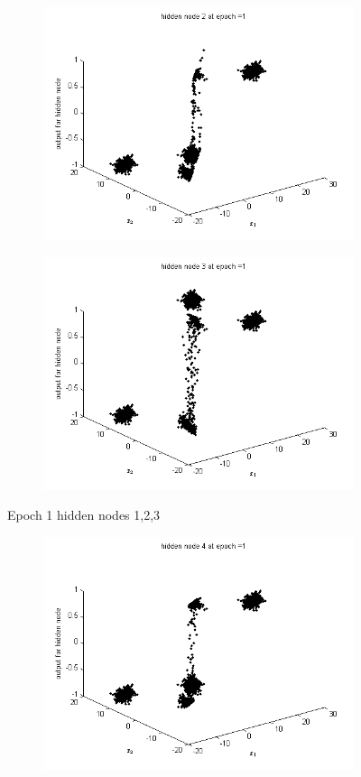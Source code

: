 \documentclass{article}
\begin{document}
\begin{flushleft}
\begin{figure}
\begin{subfigure}{.3\textwidth}
\end{subfigure}%
\begin{subfigure}{.3\textwidth}
  \centering
  \includegraphics[width=.8\linewidth]{Classification/linearlySeparable/h1_2}
  
\end{subfigure}
\begin{subfigure}{.3\textwidth}
  \centering
  \includegraphics[width=.8\linewidth]{Classification/linearlySeparable/h1_3}
  
\end{subfigure}
\caption{Epoch 1 hidden nodes 1,2,3}
\end{figure}

\begin{figure}
\begin{subfigure}{.3\textwidth}
  \centering
  \includegraphics[width=.8\linewidth]{Classification/linearlySeparable/h1_4}
 

\end{subfigure}
\end{figure}
\end{flushleft}
\end{document}
